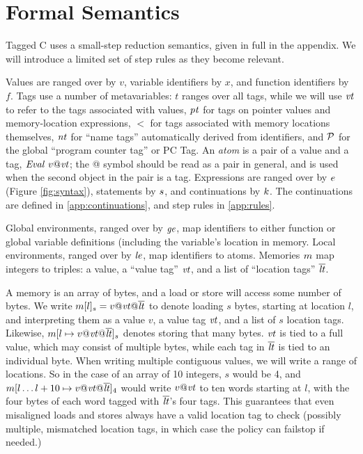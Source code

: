 \documentclass[acmsmall,review,anonymous]{acmart}\settopmatter{printfolios=true,printccs=false,printacmref=false}
\begin{document}
\section{Formal Semantics}
\label{sec:semantics}

Tagged C uses a small-step reduction semantics, given in full in the appendix. We will introduce
a limited set of step rules as they become relevant.

Values are ranged over by \(v\), variable identifiers by \(x\), and function identifiers by \(f\).
Tags use a number of metavariables: \(t\) ranges over all tags, while we will use
\(\mathit{vt}\) to refer to the tags associated with values, \(\mathit{pt}\) for tags on pointer values
and memory-location expressions, \(\lt\) for tags associated with memory locations themselves,
\(\mathit{nt}\) for ``name tags'' automatically derived from identifiers, and \(\mathcal{P}\) for the
global ``program counter tag'' or PC Tag.
An {\it atom} is a pair of a value and a tag, \(\mathit{Eval} ~ v@\mathit{vt}\); the @ symbol should be read
as a pair in general, and is used when the second object in the pair is a tag.
Expressions are ranged over by \(e\) (Figure \ref{fig:syntax}),
statements by \(s\), and continuations by \(k\).
The continuations are defined in \cref{app:continuations}, and step rules in \cref{app:rules}.

Global environments, ranged over by \(\mathit{ge}\), map identifiers to either function
or global variable definitions (including the variable's location in memory. Local environments,
ranged over by \(\mathit{le}\), map identifiers to atoms.
Memories \(m\) map integers to
triples: a value, a ``value tag'' \(\mathit{vt}\), and a list of ``location tags'' \(\overline{\mathit{lt}}\).

A memory is an array of bytes, and a load or store will access some number of bytes. We write
\(m[l]_s = v@\mathit{vt} @\overline{\mathit{lt}}\) to denote loading \(s\) bytes,
starting at location \(l\), and interpreting them as a value \(v\), a value tag \(\mathit{vt}\), and a list of
\(s\) location tags. Likewise, \(m[l \mapsto v@\mathit{vt} @ \overline{\mathit{lt}}]_s\)
denotes storing that many bytes. \(\mathit{vt}\) is tied to a full value, which may consist of
multiple bytes, while each tag in \(\overline{\mathit{lt}}\) is tied to an individual byte.
When writing multiple contiguous values, we will write a range of locations. So
in the case of an array of 10 integers, \(s\) would be 4, and
\(m[l \dots l+10 \mapsto v@\mathit{vt} @ \overline{\mathit{lt}}]_4\) would write \(v@\mathit{vt}\) to ten words starting at \(l\),
with the four bytes of each word tagged with \(\overline{\mathit{lt}}\)'s four tags.
This guarantees that even misaligned loads and stores always have a valid location tag to check
(possibly multiple, mismatched location tags, in which case the policy can failstop if needed.)
\end{document}
